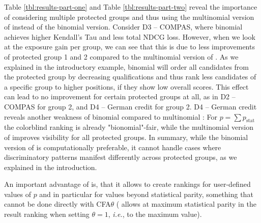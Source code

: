  Table \ref{tbl:results-part-one} and Table \ref{tbl:results-part-two} reveal the importance of considering multiple protected groups and thus using the multinomial version of \algoFAIR instead of the binomial version. 
%
Consider D3 -- COMPAS, where binomial \algoFAIR achieves higher Kendall's Tau and less total NDCG loss. 
%
However, when we look at the exposure gain per group, we can see that this is due to less improvements of protected group 1 and 2 compared to the multinomial version of \algoFAIR. 
%
As we explained in the introductory example, binomial \algoFAIR will order all candidates from the protected group by decreasing qualifications and thus rank less candidates of a specific group to higher positions, if they show low overall scores.
%
This effect can lead to no improvement for certain protected groups at all, as in D2 -- COMPAS for group 2, and D4 -- German credit for group 2. 
%
D4 -- German credit reveals another weakness of binomial \algoFAIR compared to multinomial \algoFAIR: For $p=\sum p_{\text{stat}}$ the colorblind ranking is already "bionomial"-fair, while the multinomial version of \algoFAIR improves visibility for all protected groups. 
%
In summary, while the binomial version of \algoFAIR is computationally preferable, it cannot handle cases where discriminatory patterns manifest differently across protected groups, as we explained in the introduction. 

%
An important advantage of \algoFAIR is, that it allows to create rankings for user-defined values of $p$ and in particular for values beyond statistical parity, something that cannot be done directly with CFA$\theta$ (\citet{zehlike2020matching} allows at maximum statistical parity in the result ranking when setting $\theta=1$, {\it i.e.}, to the maximum value).

